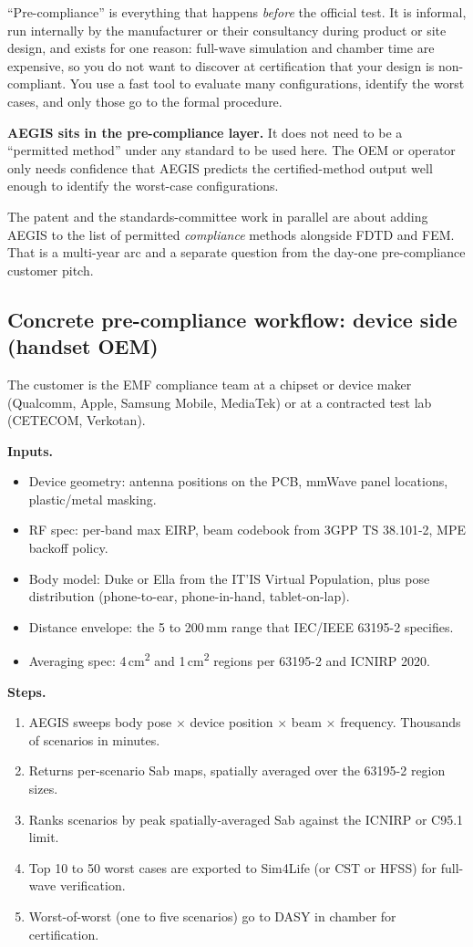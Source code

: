 \documentclass[11pt,a4paper]{article}
\begin{document}
``Pre-compliance'' is everything that happens \emph{before} the official test. It is informal, run
internally by the manufacturer or their consultancy during product or site design, and exists for one
reason: full-wave simulation and chamber time are expensive, so you do not want to discover at
certification that your design is non-compliant. You use a fast tool to evaluate many configurations,
identify the worst cases, and only those go to the formal procedure.

\textbf{AEGIS sits in the pre-compliance layer.} It does not need to be a ``permitted method'' under any
standard to be used here. The OEM or operator only needs confidence that AEGIS predicts the certified-method
output well enough to identify the worst-case configurations.

The patent and the standards-committee work in parallel are about adding AEGIS to the list of permitted
\emph{compliance} methods alongside FDTD and FEM. That is a multi-year arc and a separate question from
the day-one pre-compliance customer pitch.

\subsection*{Concrete pre-compliance workflow: device side (handset OEM)}
The customer is the EMF compliance team at a chipset or device maker (Qualcomm, Apple, Samsung Mobile,
MediaTek) or at a contracted test lab (CETECOM, Verkotan).

\textbf{Inputs.}
\begin{itemize}
  \item Device geometry: antenna positions on the PCB, mmWave panel locations, plastic/metal masking.
  \item RF spec: per-band max EIRP, beam codebook from 3GPP TS 38.101-2, MPE backoff policy.
  \item Body model: Duke or Ella from the IT'IS Virtual Population, plus pose distribution (phone-to-ear, phone-in-hand, tablet-on-lap).
  \item Distance envelope: the 5 to 200\,mm range that IEC/IEEE 63195-2 specifies.
  \item Averaging spec: 4\,cm\textsuperscript{2} and 1\,cm\textsuperscript{2} regions per 63195-2 and ICNIRP 2020.
\end{itemize}

\textbf{Steps.}
\begin{enumerate}
  \item AEGIS sweeps body pose $\times$ device position $\times$ beam $\times$ frequency. Thousands of scenarios in minutes.
  \item Returns per-scenario Sab maps, spatially averaged over the 63195-2 region sizes.
  \item Ranks scenarios by peak spatially-averaged Sab against the ICNIRP or C95.1 limit.
  \item Top 10 to 50 worst cases are exported to Sim4Life (or CST or HFSS) for full-wave verification.
  \item Worst-of-worst (one to five scenarios) go to DASY in chamber for certification.
\end{enumerate}
\end{document}
